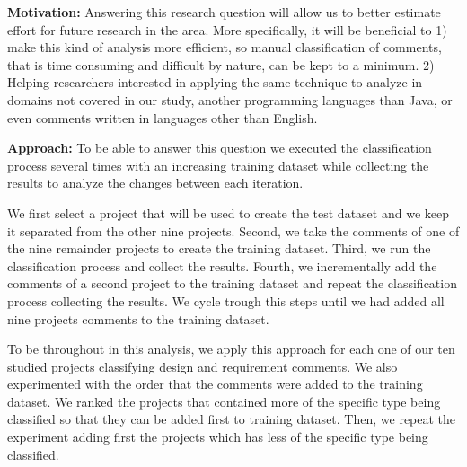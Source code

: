 
\vspace{3mm}
\noindent\rqiii
\vspace{3mm}

\noindent \textbf{Motivation:} Answering this research question will allow us to better estimate effort for future research in the area. More specifically, it will be beneficial to 1) make this kind of analysis more efficient, so manual classification of comments, that is time consuming and difficult by nature, can be kept to a minimum. 2) Helping researchers interested in applying the same technique to analyze \SATD in domains not covered in our study, another programming languages than Java, or even comments written in languages other than English. 

\vspace{1mm}
\noindent \textbf{Approach:} To be able to answer this question we executed the classification process several times with an increasing training dataset while collecting the results to analyze the changes between each iteration. 

We first select a project that will be used to create the test dataset and we keep it separated from the other nine projects. Second, we take the comments of one of the nine remainder projects to create the training dataset. Third, we run the classification process and collect the results. Fourth, we incrementally add the comments of a second project to the training dataset and repeat the classification process collecting the results. We cycle trough this steps until we had added all nine projects comments to the training dataset. 

To be throughout in this analysis, we apply this approach for each one of our ten studied projects classifying design and requirement \SATD comments. We also experimented with the order that the comments were added to the training dataset. We ranked the projects that contained more \SATD of the specific type being classified so that they can be added first to training dataset. Then, we repeat the experiment adding first the projects which has less \SATD of the specific type being classified.       

